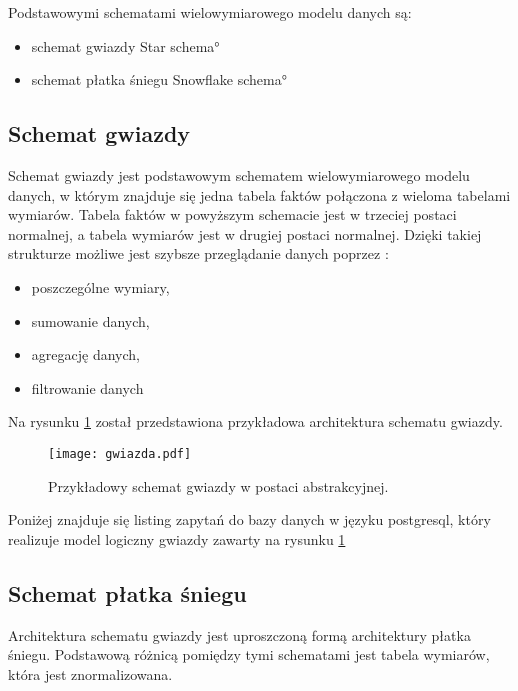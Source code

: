 Podstawowymi schematami wielowymiarowego modelu danych są:
\begin{itemize}
 \item schemat gwiazdy \ang{Star schema} 
 \item schemat płatka śniegu \ang{Snowflake schema}
\end{itemize}

\subsection{Schemat gwiazdy}
Schemat gwiazdy jest podstawowym schematem wielowymiarowego modelu danych,
 w którym znajduje się jedna tabela faktów połączona z wieloma tabelami wymiarów.
Tabela faktów w powyższym schemacie jest w trzeciej postaci normalnej, a tabela wymiarów jest w drugiej postaci normalnej.
Dzięki takiej strukturze możliwe jest szybsze przeglądanie danych poprzez \cite{TodMan} \cite{link_hd}:
\begin{itemize}
 \item poszczególne wymiary,
 \item sumowanie danych,
 \item agregację danych,
 \item filtrowanie danych
\end{itemize}

Na rysunku  \ref{fig:gwiazda} został przedstawiona przykładowa architektura schematu gwiazdy.
\begin{center}
\begin{figure}[H]
  \begin{center}
    \texttt{[image: gwiazda.pdf]}
  \end{center}
  \caption{Przykładowy schemat gwiazdy w postaci abstrakcyjnej. }
    \label{fig:gwiazda}
\end{figure}
\end{center}
Poniżej znajduje się listing zapytań do bazy danych w języku postgresql,
 który realizuje model logiczny gwiazdy zawarty na rysunku \ref{fig:gwiazda}


\subsection{Schemat płatka śniegu}
Architektura schematu gwiazdy jest uproszczoną formą architektury płatka śniegu.
Podstawową różnicą pomiędzy tymi schematami jest tabela wymiarów, która jest znormalizowana.

